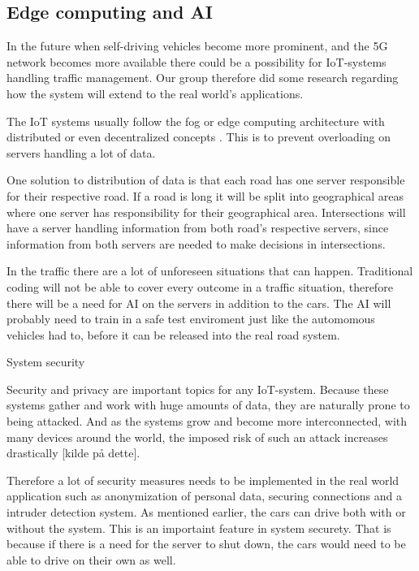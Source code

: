 
\subsection{Edge computing and AI}
In the future when self-driving vehicles become more prominent, and the 5G network becomes more available there could be a possibility for IoT-systems handling traffic management. Our group therefore did some research regarding how the system will extend to the real world’s applications. 

The IoT systems usually follow the fog or edge computing architecture with distributed or even decentralized concepts \parencite[pp 149]{iot_platforms}. This is to prevent overloading on servers handling a lot of data. 

One solution to distribution of data is that each road has one server responsible for their respective road. If a road is long it will be split into geographical areas where one server has responsibility for their geographical area. Intersections will have a server handling information from both road’s respective servers, since information from both servers are needed to make decisions in intersections.

In the traffic there are a lot of unforeseen situations that can happen. Traditional coding will not be able to cover every outcome in a traffic situation, therefore there will be a need for AI on the servers in addition to the cars. The AI will probably need to train in a safe test enviroment just like the automomous vehicles had to, before it can be released into the real road system.

System security

Security and privacy are important topics for any IoT-system. Because these systems gather and work with huge amounts of data, they are naturally prone to being attacked. And as the systems grow and become more interconnected, with many devices around the world, the imposed risk of such an attack increases drastically [kilde på dette].

Therefore a lot of security measures needs to be implemented in the real world application such as anonymization of personal data, securing connections and a intruder detection system. As mentioned earlier, the cars can drive both with or without the system. This is an importaint feature in system securety. That is because if there is a need for the server to shut down, the cars would need to be able to drive on their own as well.


